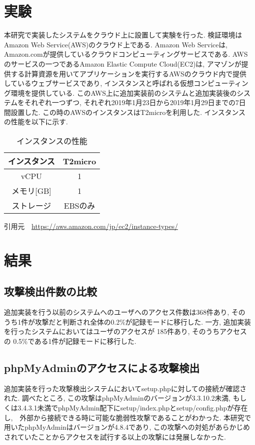 \documentclass[submit,techrep,noauthor]{ipsj}
\begin{document}
\section{実験}
本研究で実装したシステムをクラウド上に設置して実験を行った. 検証環境はAmazon Web Service(AWS)\cite{label9}のクラウド上である. Amazon Web Serviceは, Amazon.comが提供しているクラウドコンピューティングサービスである. AWSのサービスの一つであるAmazon Elastic Compute Cloud(EC2)\cite{label9}は, アマゾンが提供する計算資源を用いてアプリケーションを実行するAWSのクラウド内で提供しているウェブサービスであり, インスタンスと呼ばれる仮想コンピューティング環境を提供している.
このAWS上に追加実装前のシステムと追加実装後のシステムをそれぞれ一つずつ, それぞれ2019年1月23日から2019年1月29日までの7日間設置した. この時のAWSのインスタンスはT2microを利用した. インスタンスの性能を以下に示す.
\vspace{1pc}
\begin{table}[h]
\centering
\begin{tabular}{|c|c|}
\hline
インスタンス & T2micro \\
\hline
vCPU & 1 \\
\hline
メモリ[GB] & 1 \\
\hline
ストレージ　& EBSのみ \\
\hline
\end{tabular}
\caption{インスタンスの性能}
引用元　\url{https://aws.amazon.com/jp/ec2/instance-types/}
\end{table}

\section{結果}

\subsection{攻撃検出件数の比較}
追加実装を行う以前のシステムへのユーザへのアクセス件数は368件あり, そのうち1件が攻撃だと判断され全体の0.2\%が記録モードに移行した. 一方, 追加実装を行ったシステムにおいてはユーザのアクセスが 185件あり, そのうちアクセスの 0.5\%である1件が記録モードに移行した.

\subsection{phpMyAdminのアクセスによる攻撃検出}
追加実装を行った攻撃検出システムにおいてsetup.phpに対しての接続が確認された.
調べたところ\cite{label10}, この攻撃はphpMyAdminのバージョンが3.3.10.2未満, もしくは3.4.3.1未満でphpMyAdmin配下にsetup/index.phpとsetup/config.phpが存在し,　外部から接続できる時に可能な脆弱性攻撃であることがわかった.
本研究で用いたphpMyAdminはバージョンが4.8.4であり, この攻撃への対処があらかじめされていたことからアクセスを試行する以上の攻撃には発展しなかった.
\end{document}
